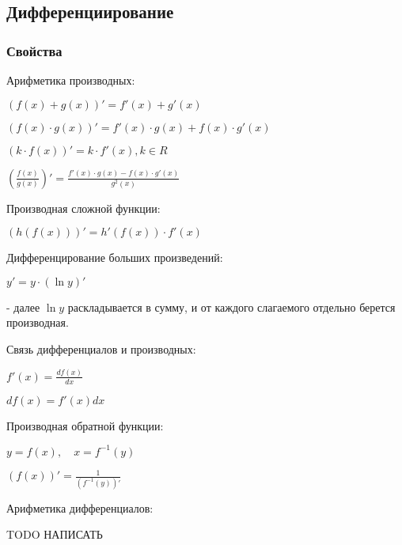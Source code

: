 \subsection{Дифференциирование}

\subsubsection{Свойства}

Арифметика производных:

$ (f(x) + g(x))' = f'(x) + g'(x) $

$ (f(x)\cdot g(x))' = f'(x)\cdot g(x) + f(x)\cdot g'(x) $

$ (k\cdot f(x))' = k\cdot f'(x), k \in R $

$ \left(\frac{f(x)}{g(x)}\right)' = \frac{f'(x)\cdot g(x) - f(x)\cdot g'(x)}{g^2(x)} $

Производная сложной функции:

$ (h(f(x)))' = h'(f(x)) \cdot f'(x) $

Дифференцирование больших произведений:

$ y' = y\cdot(\ln y)' $

- далее $\ln y$ раскладывается в сумму, и от каждого слагаемого отдельно берется производная.

Связь дифференциалов и производных:

$ f'(x) = \frac{df(x)}{dx} $

$ df(x) = f'(x) dx $

Производная обратной функции:

$ y = f(x), \quad x = f^{-1}(y) $

$ (f(x))' = \frac{1}{(f^{-1}(y))'} $

Арифметика дифференциалов:

TODO НАПИСАТЬ

